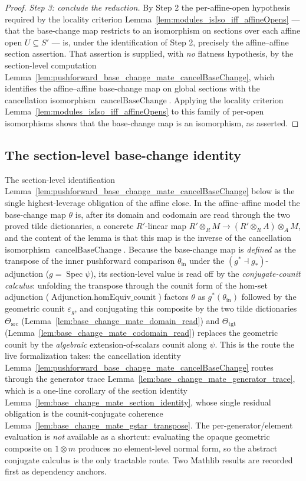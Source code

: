 \begin{proof}
  \medskip
  \emph{Step 3: conclude the reduction.} By Step 2 the per-affine-open hypothesis
  required by the locality criterion Lemma~\ref{lem:modules_isIso_iff_affineOpens} —
  that the base-change map restricts to an isomorphism on sections over each affine
  open \(U \subseteq S'\) — is, under the identification of Step 2, precisely the
  affine--affine section assertion. That assertion is supplied, with \emph{no} flatness
  hypothesis, by the section-level computation
  Lemma~\ref{lem:pushforward_base_change_mate_cancelBaseChange}, which identifies the
  affine--affine base-change map on global sections with the cancellation isomorphism
  \(\operatorname{cancelBaseChange}\). Applying the locality criterion
  Lemma~\ref{lem:modules_isIso_iff_affineOpens} to this family of per-open
  isomorphisms shows that the base-change map is an isomorphism, as asserted.
\end{proof}

\subsection{The section-level base-change identity}

The section-level identification
Lemma~\ref{lem:pushforward_base_change_mate_cancelBaseChange} below is the single
highest-leverage obligation of the affine close. In the affine--affine model the
base-change map \(\theta\) is, after its domain and codomain are read through the two
proved tilde dictionaries, a concrete \(R'\)-linear map
\(R' \otimes_R M \to (R' \otimes_R A) \otimes_A M\), and the content of the lemma is
that this map is the inverse of the cancellation isomorphism
\(\operatorname{cancelBaseChange}\). Because the base-change map is \emph{defined} as the
transpose of the inner pushforward comparison \(\theta_{\mathrm{in}}\) under the
\((g^* \dashv g_*)\)-adjunction (\(g = \operatorname{Spec}\psi\)), its section-level value
is read off by the \emph{conjugate-counit calculus}: unfolding the transpose through the
counit form of the hom-set adjunction
(\(\operatorname{Adjunction.homEquiv\_counit}\)) factors \(\theta\) as
\(g^*(\theta_{\mathrm{in}})\) followed by the geometric counit \(\varepsilon_g\), and
conjugating this composite by the two tilde dictionaries
\(\Theta_{\mathrm{src}}\) (Lemma~\ref{lem:base_change_mate_domain_read}) and
\(\Theta_{\mathrm{tgt}}\) (Lemma~\ref{lem:base_change_mate_codomain_read}) replaces the
geometric counit by the \emph{algebraic} extension-of-scalars counit along \(\psi\). This
is the route the live formalization takes: the cancellation identity
Lemma~\ref{lem:pushforward_base_change_mate_cancelBaseChange} routes through the generator
trace Lemma~\ref{lem:base_change_mate_generator_trace}, which is a one-line corollary of the
section identity Lemma~\ref{lem:base_change_mate_section_identity}, whose single residual
obligation is the counit-conjugate coherence Lemma~\ref{lem:base_change_mate_gstar_transpose}.
The per-generator/element evaluation is \emph{not} available as a shortcut: evaluating the
opaque geometric composite on \(1 \otimes m\) produces no element-level normal form, so the
abstract conjugate calculus is the only tractable route. Two Mathlib results are recorded
first as dependency anchors.

